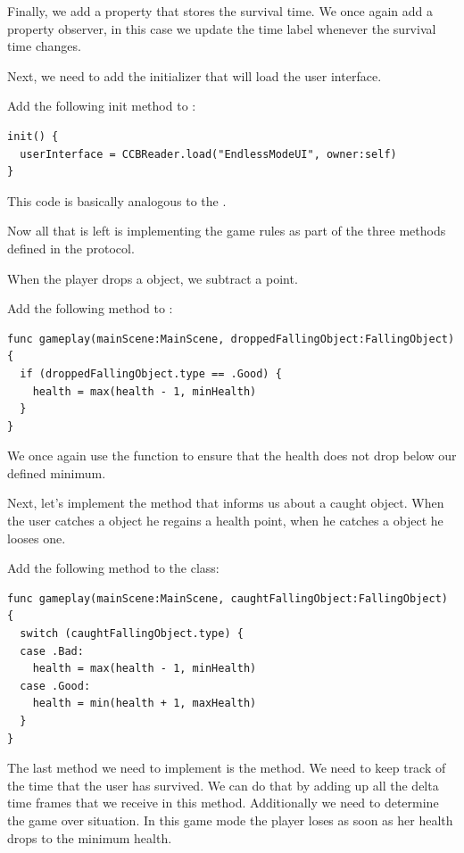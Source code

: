 Finally, we add a property that stores the survival time. We once again add a
property observer, in this case we update the time label whenever the survival
time changes.

Next, we need to add the initializer that will load the user interface.

\begin{leftbar}
Add the following init method to :
\begin{lstlisting}
init() {
  userInterface = CCBReader.load("EndlessModeUI", owner:self)
}
\end{lstlisting}
\end{leftbar}
This code is basically analogous to the .

Now all that is left is implementing the game rules as part of the three methods
defined in the  protocol. 

When the player drops a  object, we subtract a point.
\begin{leftbar}
Add the following method to :
\begin{lstlisting}
func gameplay(mainScene:MainScene, droppedFallingObject:FallingObject) {
  if (droppedFallingObject.type == .Good) {
    health = max(health - 1, minHealth)
  }
}
\end{lstlisting}
\end{leftbar}
We once again use the  function to ensure that the health does
not drop below our defined minimum.

Next, let's implement the method that informs us about a caught object. When the
user catches a  object he regains a health point, when he
catches a  object he looses one.

\begin{leftbar}
Add the following method to the  class:
\begin{lstlisting}
func gameplay(mainScene:MainScene, caughtFallingObject:FallingObject) {
  switch (caughtFallingObject.type) {
  case .Bad:
    health = max(health - 1, minHealth)
  case .Good:
    health = min(health + 1, maxHealth)
  }
}
\end{lstlisting}
\end{leftbar}

The last method we need to implement is the  method. We need to keep track of the time that the user has survived.
We can do that by adding up all the delta time frames that we receive in this
method. Additionally we need to determine the game over situation. In this game
mode the player loses as soon as her health drops to the minimum health.

